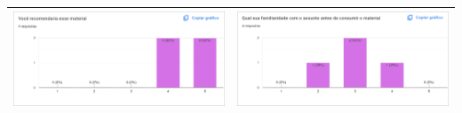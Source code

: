 \begin{center}
{\begin{tabular}{|c|c|}
            \includegraphics[width=80mm]{../assets/form-results/part-7.png} & \includegraphics[width=80mm]{../assets/form-results/part-8.png} \\ \hline
        \end{tabular}
    }
\end{center}
